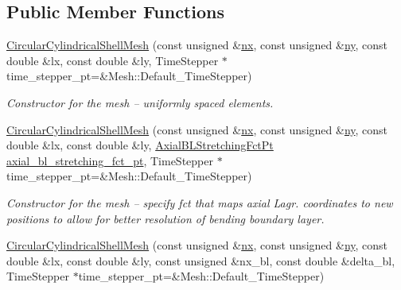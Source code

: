 \subsection*{Public Member Functions}
\begin{DoxyCompactItemize}
\item 
\hyperlink{classoomph_1_1CircularCylindricalShellMesh_ad392c085b9a8f87fd9a24e02738f5d60}{Circular\+Cylindrical\+Shell\+Mesh} (const unsigned \&\hyperlink{classoomph_1_1RectangularQuadMesh_abfef93d6322886cdce14a437186e4821}{nx}, const unsigned \&\hyperlink{classoomph_1_1RectangularQuadMesh_a86d76a55eb7c4e8bca9b74d23c8b0412}{ny}, const double \&lx, const double \&ly, Time\+Stepper $\ast$time\+\_\+stepper\+\_\+pt=\&Mesh\+::\+Default\+\_\+\+Time\+Stepper)
\begin{DoxyCompactList}\small\item\em Constructor for the mesh -- uniformly spaced elements. \end{DoxyCompactList}\item 
\hyperlink{classoomph_1_1CircularCylindricalShellMesh_a2382a9ed0cd210c7b697e6ba4f4e2b0b}{Circular\+Cylindrical\+Shell\+Mesh} (const unsigned \&\hyperlink{classoomph_1_1RectangularQuadMesh_abfef93d6322886cdce14a437186e4821}{nx}, const unsigned \&\hyperlink{classoomph_1_1RectangularQuadMesh_a86d76a55eb7c4e8bca9b74d23c8b0412}{ny}, const double \&lx, const double \&ly, \hyperlink{classoomph_1_1CircularCylindricalShellMesh_a770336fa72e8911f31b9fe3f70197a51}{Axial\+B\+L\+Stretching\+Fct\+Pt} \hyperlink{classoomph_1_1CircularCylindricalShellMesh_aa9c69dc3c6692d19706178d558d07f86}{axial\+\_\+bl\+\_\+stretching\+\_\+fct\+\_\+pt}, Time\+Stepper $\ast$time\+\_\+stepper\+\_\+pt=\&Mesh\+::\+Default\+\_\+\+Time\+Stepper)
\begin{DoxyCompactList}\small\item\em Constructor for the mesh -- specify fct that maps axial Lagr. coordinates to new positions to allow for better resolution of bending boundary layer. \end{DoxyCompactList}\item 
\hyperlink{classoomph_1_1CircularCylindricalShellMesh_aba83d68289f90a8567887443c3b9c6f0}{Circular\+Cylindrical\+Shell\+Mesh} (const unsigned \&\hyperlink{classoomph_1_1RectangularQuadMesh_abfef93d6322886cdce14a437186e4821}{nx}, const unsigned \&\hyperlink{classoomph_1_1RectangularQuadMesh_a86d76a55eb7c4e8bca9b74d23c8b0412}{ny}, const double \&lx, const double \&ly, const unsigned \&nx\+\_\+bl, const double \&delta\+\_\+bl, Time\+Stepper $\ast$time\+\_\+stepper\+\_\+pt=\&Mesh\+::\+Default\+\_\+\+Time\+Stepper)

\end{DoxyCompactItemize}
